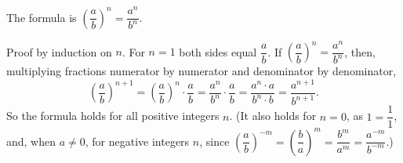The formula is $\boxed{\left(\dfrac {a}{b}\right)^n=\dfrac{a^n}{b^n}}$.

Proof by induction on $n$. For $n=1$ both sides equal $\dfrac {a}{b}$. If $\left(\dfrac {a}{b}\right)^n=\dfrac{a^n}{b^n}$, then, multiplying fractions numerator by numerator and denominator by denominator,
\[
\left(\dfrac {a}{b}\right)^{n+1}=\left(\dfrac {a}{b}\right)^n\cdot\dfrac {a}{b}=\dfrac{a^n}{b^n}\cdot\dfrac {a}{b}=\dfrac{a^{n}\cdot a}{b^{n}\cdot b}=\dfrac{a^{n+1}}{b^{n+1}} .
\]
So the formula holds for all positive integers $n$. (It also holds for $n=0$, as $1=\dfrac{1}{1}$, and, when $a\ne0$, for negative integers $n$, since $\left(\dfrac {a}{b}\right)^{-m}=\left(\dfrac {b}{a}\right)^{m}=\dfrac{b^m}{a^m}=\dfrac{a^{-m}}{b^{-m}}$.)
